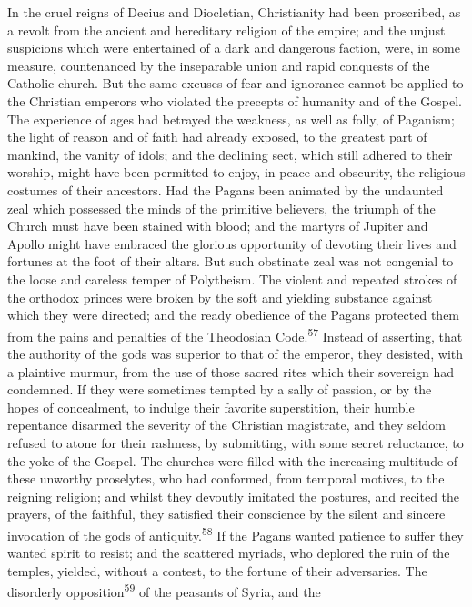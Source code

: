 In the cruel reigns of Decius and Diocletian, Christianity had
been proscribed, as a revolt from the ancient and hereditary
religion of the empire; and the unjust suspicions which were
entertained of a dark and dangerous faction, were, in some
measure, countenanced by the inseparable union and rapid
conquests of the Catholic church. But the same excuses of fear
and ignorance cannot be applied to the Christian emperors who
violated the precepts of humanity and of the Gospel. The
experience of ages had betrayed the weakness, as well as folly,
of Paganism; the light of reason and of faith had already
exposed, to the greatest part of mankind, the vanity of idols;
and the declining sect, which still adhered to their worship,
might have been permitted to enjoy, in peace and obscurity, the
religious costumes of their ancestors. Had the Pagans been
animated by the undaunted zeal which possessed the minds of the
primitive believers, the triumph of the Church must have been
stained with blood; and the martyrs of Jupiter and Apollo might
have embraced the glorious opportunity of devoting their lives
and fortunes at the foot of their altars. But such obstinate zeal
was not congenial to the loose and careless temper of Polytheism.
The violent and repeated strokes of the orthodox princes were
broken by the soft and yielding substance against which they were
directed; and the ready obedience of the Pagans protected them
from the pains and penalties of the Theodosian Code.\textsuperscript{57} Instead
of asserting, that the authority of the gods was superior to that
of the emperor, they desisted, with a plaintive murmur, from the
use of those sacred rites which their sovereign had condemned. If
they were sometimes tempted by a sally of passion, or by the
hopes of concealment, to indulge their favorite superstition,
their humble repentance disarmed the severity of the Christian
magistrate, and they seldom refused to atone for their rashness,
by submitting, with some secret reluctance, to the yoke of the
Gospel. The churches were filled with the increasing multitude of
these unworthy proselytes, who had conformed, from temporal
motives, to the reigning religion; and whilst they devoutly
imitated the postures, and recited the prayers, of the faithful,
they satisfied their conscience by the silent and sincere
invocation of the gods of antiquity.\textsuperscript{58} If the Pagans wanted
patience to suffer they wanted spirit to resist; and the
scattered myriads, who deplored the ruin of the temples, yielded,
without a contest, to the fortune of their adversaries. The
disorderly opposition\textsuperscript{59} of the peasants of Syria, and the
